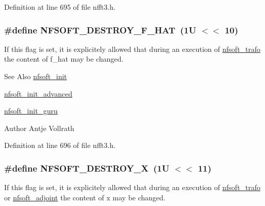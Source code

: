 Definition at line 695 of file nfft3.\-h.

\hypertarget{group__nfsoft_gad324d67114a4f52a9fc86d2639745acd}{
\subsubsection[{N\-F\-S\-O\-F\-T\-\_\-\-D\-E\-S\-T\-R\-O\-Y\-\_\-\-F\-\_\-\-H\-A\-T}]{\setlength{\rightskip}{0pt plus 5cm}\#define N\-F\-S\-O\-F\-T\-\_\-\-D\-E\-S\-T\-R\-O\-Y\-\_\-\-F\-\_\-\-H\-A\-T~(1\-U $<$$<$ 10)}}\label{group__nfsoft_gad324d67114a4f52a9fc86d2639745acd}
If this flag is set, it is explicitely allowed that during an execution of \hyperlink{group__nfsoft_gae243cd75d7571a99eae53818e32355fb}{nfsoft\-\_\-trafo} the content of {\ttfamily f\-\_\-hat} may be changed.

\begin{DoxySeeAlso}{See Also}
\hyperlink{group__nfsoft_ga31c884458165fa204073c6c16c10775e}{nfsoft\-\_\-init} 

\hyperlink{group__nfsoft_gaf4aec4ee2a2a5d56ca27c4f1a7f90b18}{nfsoft\-\_\-init\-\_\-advanced} 

\hyperlink{group__nfsoft_ga1c13cdd3f82f48fa41acdd313cdc2052}{nfsoft\-\_\-init\-\_\-guru} 
\end{DoxySeeAlso}
\begin{DoxyAuthor}{Author}
Antje Vollrath 
\end{DoxyAuthor}


Definition at line 696 of file nfft3.\-h.

\hypertarget{group__nfsoft_gab7ca87a4bb214bcc25d544aa0b6dd503}{
\subsubsection[{N\-F\-S\-O\-F\-T\-\_\-\-D\-E\-S\-T\-R\-O\-Y\-\_\-\-X}]{\setlength{\rightskip}{0pt plus 5cm}\#define N\-F\-S\-O\-F\-T\-\_\-\-D\-E\-S\-T\-R\-O\-Y\-\_\-\-X~(1\-U $<$$<$ 11)}}\label{group__nfsoft_gab7ca87a4bb214bcc25d544aa0b6dd503}
If this flag is set, it is explicitely allowed that during an execution of \hyperlink{group__nfsoft_gae243cd75d7571a99eae53818e32355fb}{nfsoft\-\_\-trafo} or \hyperlink{group__nfsoft_ga08395b1dd90f9a2565685d17460afc5b}{nfsoft\-\_\-adjoint} the content of {\ttfamily x} may be changed.

